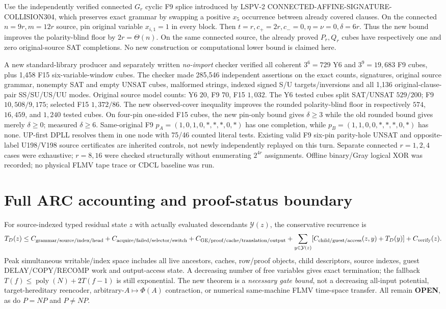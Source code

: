 \documentclass[11pt]{article}
\begin{document}
Use the independently verified connected $G_r$ cyclic F9 splice introduced by LSPV-2 CONNECTED-AFFINE-SIGNATURE-COLLISION304, which preserves exact grammar by swapping a positive $x_5$ occurrence between already covered clauses. On the connected $n=9r,m=12r$ source, pin original variable $x_{i,1}=1$ in every block. Then $t=r,c_+=2r,c_-=0,\eta=\nu=0,\delta=6r$. Thus the new bound improves the polarity-blind floor by $2r=\Theta(n)$. On the same connected source, the already proved $P_r,Q_r$ cubes have respectively one and zero original-source SAT completions. No new construction or computational lower bound is claimed here.

A new standard-library producer and separately written \emph{no-import} checker verified all coherent $3^6=729$ Y6 and $3^9=19{,}683$ F9 cubes, plus 1,458 F15 six-variable-window cubes. The checker made 285,546 independent assertions on the exact counts, signatures, original source grammar, nonempty SAT and empty UNSAT cubes, malformed strings, indexed signed S/U targets/inversions and all 1,136 original-clause-pair SS/SU/US/UU modes. Original source model counts: Y6 $20$, F9 $70$, F15 $1{,}032$. The Y6 tested cubes split SAT/UNSAT $529/200$; F9 $10{,}508/9{,}175$; selected F15 $1{,}372/86$. The new observed-cover inequality improves the rounded polarity-blind floor in respectively $574$, $16{,}459$, and $1{,}240$ tested cubes. On four-pin one-sided F15 cubes, the new pin-only bound gives $\delta\ge3$ while the old rounded bound gives merely $\delta\ge0$; measured $\delta\ge6$. Same-original F9 $p_A=(1,0,1,0,*,*,*,0,*)$ has one completion, while $p_B=(1,1,0,0,*,*,*,0,*)$ has none. UP-first DPLL resolves them in one node with 75/46 counted literal tests. Existing valid F9 six-pin parity-hole UNSAT and opposite-label U198/V198 source certificates are inherited controls, not newly independently replayed on this turn. Separate connected $r=1,2,4$ cases were exhaustive; $r=8,16$ were checked structurally without enumerating $2^{4r}$ assignments. Offline binary/Gray logical XOR was recorded; no physical FLMV tape trace or CDCL baseline was run.

\section{Full ARC accounting and proof-status boundary}
For source-indexed typed residual state $z$ with actually evaluated descendants $\mathcal Y(z)$, the conservative recurrence is
\[
T_D(z)\le C_{\rm grammar/source/index/head}
+C_{\rm acquire/failed/selector/switch}
+C_{\rm GE/proof/cache/translation/output}
+\sum_{y\in\mathcal Y(z)}[C_{\rm child/guest/access}(z,y)+T_D(y)]
+C_{\rm verify}(z).
\]
Peak simultaneous writable/index space includes all live ancestors, caches, row/proof objects, child descriptors, source indexes, guest DELAY/COPY/RECOMP work and output-access state. A decreasing number of free variables gives exact termination; the fallback $T(f)\le\operatorname{poly}(N)+2T(f-1)$ is still exponential. The new theorem is a \emph{necessary gate bound}, not a decreasing all-input potential, target-hereditary reencoder, arbitrary-$A\mapsto\Phi(A)$ contraction, or numerical same-machine FLMV time-space transfer. All remain \textbf{OPEN}, as do $P=NP$ and $P\ne NP$.
\end{document}
